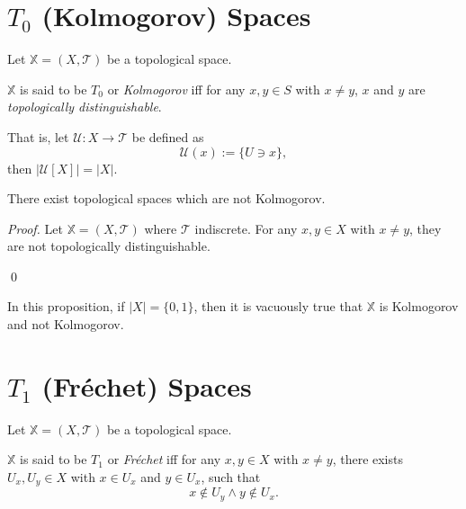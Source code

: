 \section{$T_0$ (Kolmogorov) Spaces}


\begin{definition}
	\label{def: T0 space}
	Let $\mathbb X = (X, \mathcal T)$ be a topological space.
	
	$\mathbb X$ is said to be $T_0$ or \textit{Kolmogorov} iff for any $x,y \in S$ with $x \ne y$, $x$ and $y$ are \textit{topologically distinguishable}.
	
	That is, let $\mathcal U: X \to \mathcal T$ be defined as
	$$
	\mathcal U(x) := \{U \ni x\},
	$$
	then $|\mathcal U[X]| = |X|$.
\end{definition}


\begin{proposition}
	There exist topological spaces which are not Kolmogorov.
	
	\begin{proof}
		Let $\mathbb X = (X, \mathcal T)$ where $\mathcal T$ indiscrete. For any $x,y \in X$ with $x \ne y$, they are not topologically distinguishable.

		\qed
	\end{proof}
\end{proposition}


\begin{note}
	In this proposition, if $|X| = \{0,1\}$, then it is vacuously true that $\mathbb X$ is Kolmogorov and not Kolmogorov.
\end{note}


\section{$T_1$ (Fr\'echet) Spaces}


\begin{definition}
	\label{def: T1 space}
	Let $\mathbb X = (X, \mathcal T)$ be a topological space.
	
	$\mathbb X$ is said to be $T_1$ or \textit{Fr\'echet} iff for any $x, y \in X$ with $x \ne y$, there exists $U_x, U_y \in X$ with $x \in U_x$ and $y \in U_x$, such that
	$$
	x \notin U_y \land y \notin U_x.
	$$
\end{definition}




